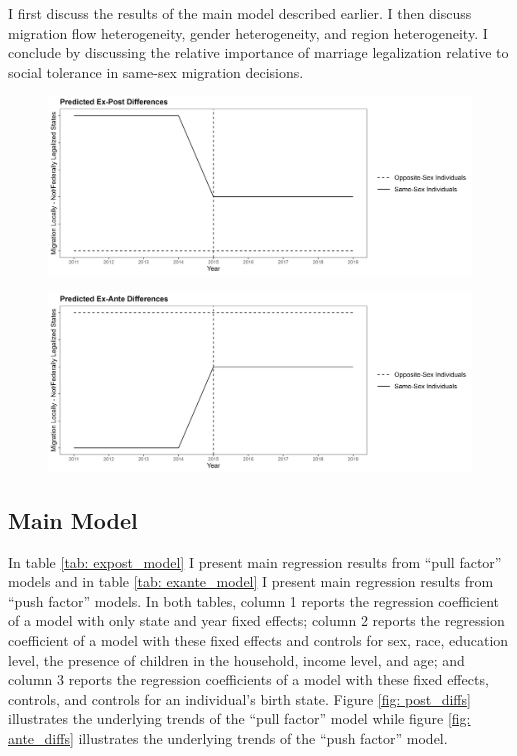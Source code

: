 \documentclass[12pt,letterpaper]{article}
\begin{document}
I first discuss the results of the main model described earlier. I then discuss migration flow heterogeneity, gender heterogeneity, and region heterogeneity. I conclude by discussing the relative importance of marriage legalization relative to social tolerance in same-sex migration decisions.

\begin{centering}
\begin{figure}
    \centering
    \includegraphics[width=0.75\linewidth]{outputs/summary_stats/ex_post_diffs.png}
    \caption{}
    \label{fig: ex_post_diffs}
\end{figure}

\begin{figure}
    \centering
    \includegraphics[width=0.75\linewidth]{outputs/summary_stats/ex_ante_diffs.png}
    \caption{}
    \label{fig: ex_ante_diffs}
\end{figure}
\end{centering}

\clearpage
\subsection{Main Model} %
In table \ref{tab: expost_model} I present main regression results from “pull factor” models and in table \ref{tab: exante_model} I present main regression results from “push factor” models. In both tables, column 1 reports the regression coefficient of a model with only state and year fixed effects; column 2 reports the regression coefficient of a model with these fixed effects and controls for sex, race, education level, the presence of children in the household, income level, and age; and column 3 reports the regression coefficients of a model with these fixed effects, controls, and controls for an individual’s birth state. Figure \ref{fig: post_diffs} illustrates the underlying trends of the “pull factor” model while figure \ref{fig: ante_diffs} illustrates the underlying trends of the “push factor” model. 
\end{document}
